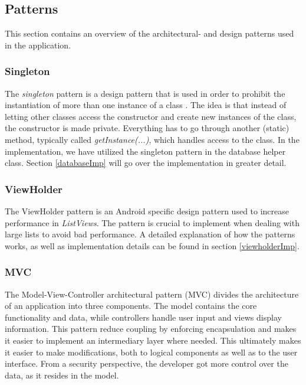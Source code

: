 
\subsection{Patterns}
This section contains an overview of the architectural- and design patterns used in the application. 


\subsubsection{Singleton}
\label{singletonArc}
The \emph{singleton} pattern is a design pattern that is used in order to prohibit the instantiation of more than one instance of a class \cite{softwarearchitecture}. The idea is that instead of letting other classes access the constructor and create new instances of the class, the constructor is made private. Everything has to go through another (static) method, typically called \emph{getInstance(...)}, which handles access to the class. In the implementation, we have utilized the singleton pattern in the database helper class. Section \ref{databaseImp} will go over the implementation in greater detail.

\subsubsection{ViewHolder}
\label{viewholderArc}
The ViewHolder pattern is an Android specific design pattern used to increase performance in \emph{ListViews}. The pattern is crucial to implement when dealing with large lists to avoid bad performance. A detailed explanation of how the patterns works, as well as implementation details can be found in section \ref{viewholderImp}.


\subsubsection{MVC}
The Model-View-Controller architectural pattern (MVC) divides the architecture of an application into three components. The model contains the core functionality and data, while controllers handle user input and views display information. This pattern reduce coupling by enforcing encapsulation and makes it easier to implement an intermediary layer where needed. This ultimately makes it easier to make modifications, both to logical components as well as to the user interface. From a security perspective, the developer got more control over the data, as it resides in the model.


